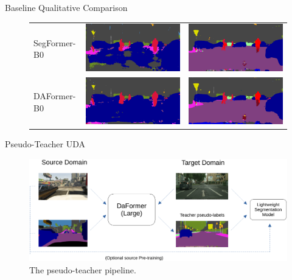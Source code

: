 \documentclass{lib/curtin_format}
\begin{document}
\begin{frame}{Baseline Qualitative Comparison}
    \begin{figure}[]
        \centering
        \begin{tabular}{lll}
            SegFormer-B0 & \includegraphics[width=.3\linewidth]{res/lightweight-uda-baseline-qualitative/segformer-mitb0-sourceonly.png} & \includegraphics[width=.3\linewidth]{res/lightweight-uda-baseline-qualitative/segformer-mitb0-selftraining.png} \\
            DAFormer-B0  & \includegraphics[width=.3\linewidth]{res/lightweight-uda-baseline-qualitative/daformer-mitb0-sourceonly.png}  & \includegraphics[width=.3\linewidth]{res/lightweight-uda-baseline-qualitative/daformer-mitb0-selftraining.png}  \\
        \end{tabular}
    \end{figure}
\end{frame}

\begin{frame}{Pseudo-Teacher UDA}
    \begin{figure}[ht]
        \centering
        \includegraphics[width=\textwidth]{res/pseudo-teacher-pipeline.pdf}
        \caption{The pseudo-teacher pipeline.}
        \label{fig:pseudo-teacher-pipeline}
    \end{figure}
\end{frame}
\end{document}
